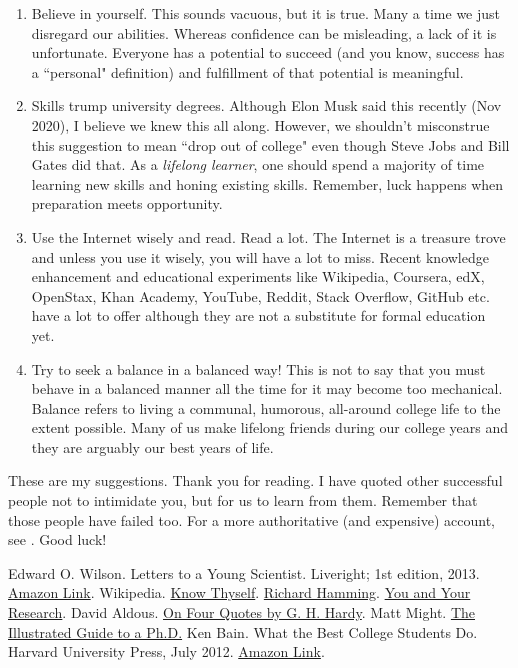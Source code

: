 \documentclass[a6paper]{article}
\begin{document}
\begin{enumerate}
    \item Believe in yourself. This sounds vacuous, but it is true. Many a time we just disregard our abilities. Whereas confidence can be misleading, a lack of it is unfortunate. Everyone has a potential to succeed (and you know, success has a ``personal" definition) and fulfillment of that potential is meaningful. 
    \item Skills trump university degrees. Although Elon Musk said this recently (Nov 2020), I believe we knew this all along. However, we shouldn't misconstrue this suggestion to mean ``drop out of college" even though Steve Jobs and Bill Gates did that. As a \emph{lifelong learner}, one should spend a majority of time learning new skills and honing existing skills. Remember, luck happens when preparation meets opportunity.
    \item Use the Internet wisely and read. Read a lot. The Internet is a treasure trove and unless you use it wisely, you will have a lot to miss. Recent knowledge enhancement and educational experiments like Wikipedia, Coursera, edX, OpenStax, Khan Academy, YouTube, Reddit, Stack Overflow, GitHub etc. have a lot to offer although they are not a substitute for formal education yet.
    \item Try to seek a balance in a balanced way! This is not to say that you must behave in a balanced manner all the time for it may become too mechanical. Balance refers to living a communal, humorous, all-around college life to the extent possible. Many of us make lifelong friends during our college years and they are arguably our best years of life. 
\end{enumerate}

These are my suggestions. Thank you for reading. I have quoted other successful people not to intimidate you, but for us to learn from them. Remember that those people have failed too. For a more authoritative (and expensive) account, see \cite{ken-bain}. Good luck!

\begin{thebibliography}{00}
     Edward O. Wilson. Letters to a Young Scientist. Liveright; 1st edition, 2013. \href{https://www.amazon.in/Letters-Young-Scientist-Edward-Wilson-ebook/dp/B00AR3551Y}{Amazon Link}.
     Wikipedia. \href{https://en.wikipedia.org/wiki/Know_thyself}{Know Thyself}.
     \href{https://en.wikipedia.org/wiki/Richard_Hamming}{Richard Hamming}. \href{https://www.cs.virginia.edu/~robins/YouAndYourResearch.html}{You and Your Research}.
     David Aldous. \href{https://medium.com/cantors-paradise/on-four-quotes-from-g-h-hardy-36083e56228e}{On Four Quotes by G. H. Hardy}.
     Matt Might. \href{http://matt.might.net/articles/phd-school-in-pictures/}{The Illustrated Guide to a Ph.D.}
     Ken Bain. What the Best College Students Do. Harvard University Press, July 2012. \href{https://www.amazon.in/What-Best-College-Students-Do-ebook/dp/B008L42UJ6}{Amazon Link}.
\end{thebibliography}
\end{document}
